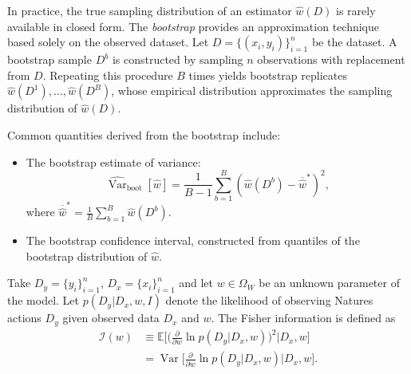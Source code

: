 \begin{example}
	In practice, the true sampling distribution of an estimator $\hat{w}(D)$ is rarely available in closed form. The \emph{bootstrap} provides an approximation technique based solely on the observed dataset. Let $D = \{(x_i,y_i)\}_{i=1}^n$ be the dataset. A bootstrap sample $D^{b}$ is constructed by sampling $n$ observations with replacement from $D$. Repeating this procedure $B$ times yields bootstrap replicates $\hat{w}(D^{1}), \ldots, \hat{w}(D^{B})$, whose empirical distribution approximates the sampling distribution of $\hat{w}(D)$. 
	
	Common quantities derived from the bootstrap include:
	\begin{itemize}
		\item The bootstrap estimate of variance:
		\begin{equation}
			\widehat{\operatorname{Var}}_{\mathrm{boot}}[\hat{w}] = \frac{1}{B-1}\sum_{b=1}^B \left(\hat{w}(D^{b}) - \overline{\hat{w}}^{*}\right)^2,
		\end{equation}
		where $\overline{\hat{w}}^{*} = \frac{1}{B}\sum_{b=1}^B \hat{w}(D^{b})$.
		\item The bootstrap confidence interval, constructed from quantiles of the bootstrap distribution of $\hat{w}$.
	\end{itemize}
\end{example}


\begin{definition}
	\label{def:fisher_information}
	Take $D_y= \{y_i\}_{i=1}^n$, $D_x= \{x_i\}_{i=1}^n$ and let $w \in \Omega_W$ be an unknown parameter of the model. Let $p(D_y | D_x, w, I)$ denote the likelihood of observing Natures actions $D_y$ given observed data $D_x$ and $w$. The Fisher information is defined as
	\begin{equation}
		\begin{split}
			\mathcal{I}(w) &\equiv \mathbb{E} \bigg[\bigg(\frac{\partial}{\partial w} \ln p(D_y|D_x, w)\bigg)^2 \Bigg| D_x, w\bigg]\\
			&= \operatorname{Var}\bigg[\frac{\partial}{\partial w} \ln p(D_y|D_x, w) \Bigg| D_x, w\bigg].
		\end{split}
	\end{equation}
\end{definition}

